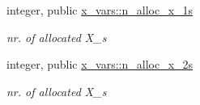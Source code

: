 \begin{DoxyCompactItemize}
integer, public \hyperlink{namespacex__vars_af565ad5c65071b130e69d528aa6faf1d}{x\+\_\+vars\+::n\+\_\+alloc\+\_\+x\+\_\+1s}
\begin{DoxyCompactList}\small\item\em nr. of allocated {\ttfamily X\+\_}\textquotesingle{}s \end{DoxyCompactList}\item 
integer, public \hyperlink{namespacex__vars_add0d925899063fbe0c4ff05d21f35a23}{x\+\_\+vars\+::n\+\_\+alloc\+\_\+x\+\_\+2s}
\begin{DoxyCompactList}\small\item\em nr. of allocated {\ttfamily X\+\_}\textquotesingle{}s \end{DoxyCompactList}\end{DoxyCompactItemize}

